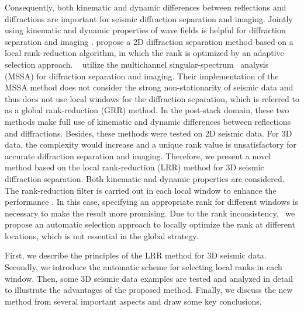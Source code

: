 Consequently, both kinematic and dynamic differences between reflections and diffractions are important for seismic diffraction separation and imaging. Jointly using kinematic and dynamic properties of wave fields is helpful for diffraction separation and imaging \cite[]{2010Separation}. 
\cite[]{2020Separation} propose a 2D diffraction separation method based on a local rank-reduction algorithm, in which the rank is optimized by an adaptive selection approach.  \cite[]{2020Diffraction} utilize the multichannel singular-spectrum  analysis (MSSA) for diffraction separation and imaging. Their implementation of the MSSA method does not consider the strong non-stationarity of seismic data and thus does not use local windows for the diffraction separation, which is referred to as a global rank-reduction (GRR) method. In the post-stack domain, these two methods make full use of kinematic and dynamic differences between reflections and diffractions. Besides, these methods were tested on 2D seismic data. For 3D data, the complexity would increase and a unique rank value is unsatisfactory for accurate diffraction separation and imaging. 
Therefore, we present a novel method based on the local rank-reduction (LRR) method for 3D seismic diffraction separation. Both kinematic and dynamic properties are considered. The rank-reduction filter is carried out in each local window to enhance the performance \cite[]{shaohuan2017gji,yangkang2017ieee,yangkang2019nc}. In this case, specifying an appropriate rank for different windows is necessary to make the result more promising. Due to the rank inconsistency,  we propose an automatic selection approach to locally optimize the rank at different locations, which is not essential in the global strategy. 

First, we describe the principles of the LRR method for 3D seismic data. Secondly, we introduce the automatic scheme for selecting local ranks in each window. Then, some 3D seismic data examples are tested and analyzed in detail to illustrate the advantages of the proposed method. Finally, we discuss the new method from several important aspects and draw some key conclusions.

